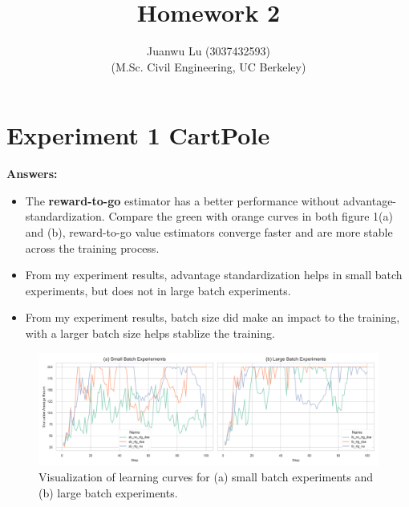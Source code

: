 \documentclass[10pt, letterpaper]{article}
\title{%
    \textbf{Homework 2}
}
\author{Juanwu Lu (3037432593)\\ \small(M.Sc. Civil Engineering, UC Berkeley)}
\date{}
\begin{document}
    \maketitle
    \thispagestyle{fancy}
    \pagestyle{plain}

    \section*{Experiment 1 CartPole}
    \textbf{Answers:}
    \begin{itemize}
        \item The \textbf{reward-to-go} estimator has a better performance without advantage-standardization. Compare the green with orange curves in both figure 1(a) and (b), reward-to-go value estimators converge faster and are more stable across the training process.
        \item From my experiment results, advantage standardization helps in small batch experiments, but does not in large batch experiments.
        \item From my experiment results, batch size did make an impact to the training, with a larger batch size helps stablize the training.
    \end{itemize}

    \begin{figure}[thbp]
        \centering
        \includegraphics[width=\textwidth]{exp_01.png}
        \caption{Visualization of learning curves for (a) small batch experiments and (b) large batch experiments.}
        \label{fig:1}
    \end{figure}
\end{document}
